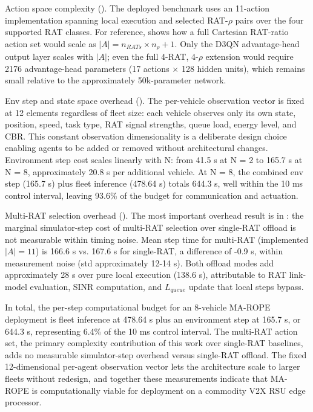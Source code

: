 

Action space complexity (). The deployed benchmark uses an 11-action implementation spanning local execution and selected RAT-$\rho$ pairs over the four supported RAT classes. For reference,  shows how a full Cartesian RAT-ratio action set would scale as $|A| = n_{RATs} \times n_\rho + 1$. Only the D3QN advantage-head output layer scales with $|A|$; even the full 4-RAT, 4-$\rho$ extension would require 2176 advantage-head parameters (17 actions $\times$ 128 hidden units), which remains small relative to the approximately 50k-parameter network.



Env step and state space overhead (). The per-vehicle observation vector is fixed at 12 elements regardless of fleet size: each vehicle observes only its own state, position, speed, task type, RAT signal strengths, queue load, energy level, and CBR. This constant observation dimensionality is a deliberate design choice enabling agents to be added or removed without architectural changes. Environment step cost scales linearly with N: from 41.5 \textmu s at N = 2 to 165.7 \textmu s at N = 8, approximately 20.8 \textmu s per additional vehicle. At N = 8, the combined env step (165.7 \textmu s) plus fleet inference (478.64 \textmu s) totals 644.3 \textmu s, well within the 10 ms control interval, leaving 93.6\% of the budget for communication and actuation.



Multi-RAT selection overhead (). The most important overhead result is in : the marginal simulator-step cost of multi-RAT selection over single-RAT offload is not measurable within timing noise. Mean step time for multi-RAT (implemented $|A| = 11$) is 166.6 \textmu s vs. 167.6 \textmu s for single-RAT, a difference of -0.9 \textmu s, within measurement noise (std approximately 12-14 \textmu s). Both offload modes add approximately 28 \textmu s over pure local execution (138.6 \textmu s), attributable to RAT link-model evaluation, SINR computation, and $L_{queue}$ update that local steps bypass.



In total, the per-step computational budget for an 8-vehicle MA-ROPE deployment is fleet inference at 478.64 \textmu s plus an environment step at 165.7 \textmu s, or 644.3 \textmu s, representing 6.4\% of the 10 ms control interval. The multi-RAT action set, the primary complexity contribution of this work over single-RAT baselines, adds no measurable simulator-step overhead versus single-RAT offload. The fixed 12-dimensional per-agent observation vector lets the architecture scale to larger fleets without redesign, and together these measurements indicate that MA-ROPE is computationally viable for deployment on a commodity V2X RSU edge processor.


